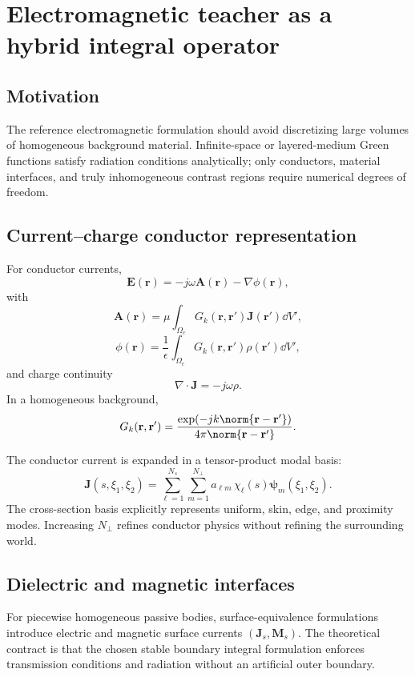 \section{Electromagnetic teacher as a hybrid integral operator}

\subsection{Motivation}

The reference electromagnetic formulation should avoid discretizing large
volumes of homogeneous background material. Infinite-space or layered-medium
Green functions satisfy radiation conditions analytically; only conductors,
material interfaces, and truly inhomogeneous contrast regions require numerical
degrees of freedom.

\subsection{Current--charge conductor representation}

For conductor currents,
\[
 \mathbf E(\mathbf r)
 =-j\omega\mathbf A(\mathbf r)-\nabla\phi(\mathbf r),
\]
with
\[
 \mathbf A(\mathbf r)
 =\mu\int_{\Omega_c}
   G_k(\mathbf r,\mathbf r')\mathbf J(\mathbf r')\dd V',
\]
\[
 \phi(\mathbf r)
 =\frac{1}{\epsilon}
  \int_{\Omega_c}
  G_k(\mathbf r,\mathbf r')\rho(\mathbf r')\dd V',
\]
and charge continuity
\[
  \nabla\cdot\mathbf J=-j\omega\rho.
\]
In a homogeneous background,
\[
 G_k(\mathbf r,\mathbf r')
 =\frac{\exp(-jk\norm{\mathbf r-\mathbf r'})}
        {4\pi\norm{\mathbf r-\mathbf r'}}.
\]

The conductor current is expanded in a tensor-product modal basis:
\[
 \mathbf J(s,\xi_1,\xi_2)
 =
 \sum_{\ell=1}^{N_s}\sum_{m=1}^{N_\perp}
 a_{\ell m}\,\chi_\ell(s)\bm\psi_m(\xi_1,\xi_2).
\]
The cross-section basis explicitly represents uniform, skin, edge, and
proximity modes. Increasing $N_\perp$ refines conductor physics without
refining the surrounding world.

\subsection{Dielectric and magnetic interfaces}

For piecewise homogeneous passive bodies, surface-equivalence formulations
introduce electric and magnetic surface currents $(\mathbf J_s,\mathbf M_s)$.
The theoretical contract is that the chosen stable boundary integral
formulation enforces transmission conditions and radiation without an
artificial outer boundary.

